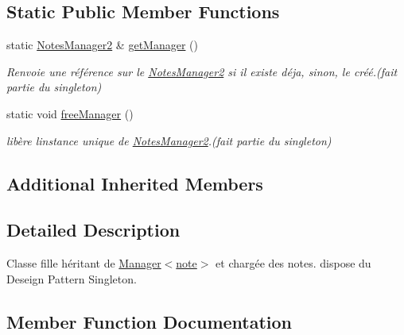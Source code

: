 \subsection*{Static Public Member Functions}
\begin{DoxyCompactItemize}
\item 
\mbox{\label{class_notes_manager2_a392bc750d869bacbe50337531213f248}} 
static \hyperlink{class_notes_manager2}{Notes\+Manager2} \& \hyperlink{class_notes_manager2_a392bc750d869bacbe50337531213f248}{get\+Manager} ()
\begin{DoxyCompactList}\small\item\em Renvoie une référence sur le \hyperlink{class_notes_manager2}{Notes\+Manager2} si il existe déja, sinon, le créé.(fait partie du singleton) \end{DoxyCompactList}\item 
\mbox{\label{class_notes_manager2_abdc16834a0e2ab7c8b3937674c725a0d}} 
static void \hyperlink{class_notes_manager2_abdc16834a0e2ab7c8b3937674c725a0d}{free\+Manager} ()
\begin{DoxyCompactList}\small\item\em libère l\textquotesingle{}instance unique de \hyperlink{class_notes_manager2}{Notes\+Manager2}.(fait partie du singleton) \end{DoxyCompactList}\end{DoxyCompactItemize}
\subsection*{Additional Inherited Members}


\subsection{Detailed Description}
Classe fille héritant de \hyperlink{class_manager}{Manager$<$note$>$} et chargée des notes. dispose du Deseign Pattern Singleton. 

\subsection{Member Function Documentation}
\mbox{\label{class_notes_manager2_a53819d123894c31bbbab66b3d0bf0ff0}} 
